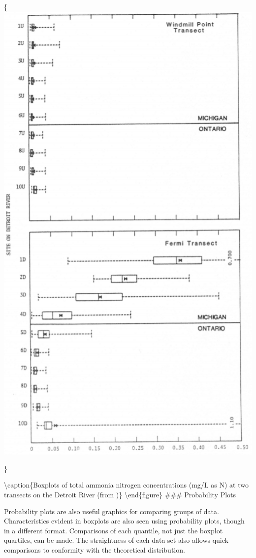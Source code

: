 \documentclass[]{book}
\begin{document}
\{\centering \includegraphics[width=6.97in]{figures/2_21}

\}

\textbackslash{}caption\{Boxplots of total ammonia nitrogen concentrations (mg/L as N) at two transects on the Detroit River (from \citet{holtschlag_changes_1987})\}\label{fig:fig-2-21}
\textbackslash{}end\{figure\}
\#\#\# Probability Plots

Probability plots are also useful graphics for comparing groups of data. Characteristics evident in boxplots are also seen using probability plots, though in a different format. Comparisons of each quantile, not just the boxplot quartiles, can be made. The straightness of each data set also allows quick comparisons to conformity with the theoretical distribution.
\end{document}
